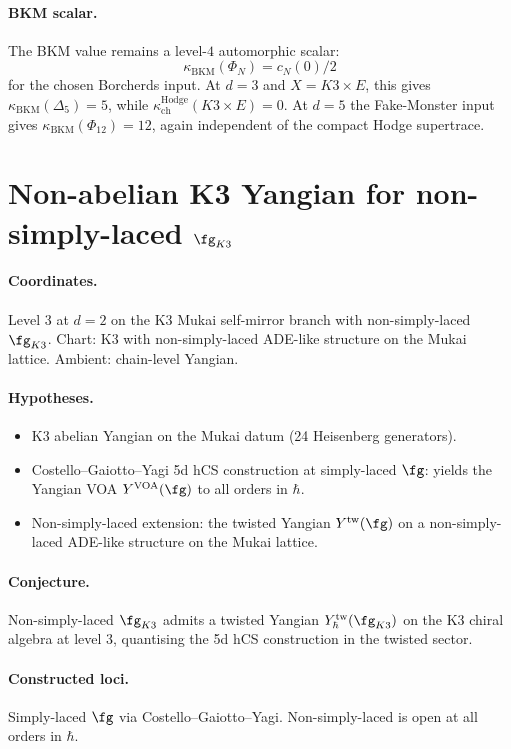 \paragraph{BKM scalar.} The BKM value remains a level-$4$ automorphic
scalar:
\[
 \kappa_{\mathrm{BKM}}(\Phi_N)=c_N(0)/2
\]
for the chosen Borcherds input. At $d=3$ and $X=K3\times E$, this gives
$\kappa_{\mathrm{BKM}}(\Delta_5)=5$, while
$\kappa_{\mathrm{ch}}^{\mathrm{Hodge}}(K3\times E)=0$. At $d=5$ the
Fake-Monster input gives $\kappa_{\mathrm{BKM}}(\Phi_{12})=12$, again
independent of the compact Hodge supertrace.

\section{Non-abelian K3 Yangian for non-simply-laced $\fg_{K3}$}
\label{sec:open-nonabelian-K3-Yangian}

\paragraph{Coordinates.} Level 3 at $d = 2$ on the K3 Mukai self-mirror
branch with non-simply-laced $\fg_{K3}$. Chart: K3 with
non-simply-laced ADE-like structure on the Mukai lattice. Ambient:
chain-level Yangian.

\paragraph{Hypotheses.}
\begin{itemize}[nosep]
\item K3 abelian Yangian on the Mukai datum
  (24 Heisenberg generators).
\item Costello--Gaiotto--Yagi 5d hCS construction at simply-laced
  $\fg$: yields the Yangian VOA $Y^{\mathrm{VOA}}(\fg)$ to all orders
  in $\hbar$.
\item Non-simply-laced extension: the twisted Yangian
  $Y^{\mathrm{tw}}(\fg)$ on a non-simply-laced ADE-like
  structure on the Mukai lattice.
\end{itemize}

\paragraph{Conjecture.} Non-simply-laced
$\fg_{K3}$ admits a twisted Yangian
$Y^{\mathrm{tw}}_\hbar(\fg_{K3})$ on the K3 chiral algebra at level 3,
quantising the 5d hCS construction in the twisted sector.

\paragraph{Constructed loci.} Simply-laced $\fg$ via Costello--Gaiotto--Yagi.
Non-simply-laced is open at all orders in $\hbar$.

